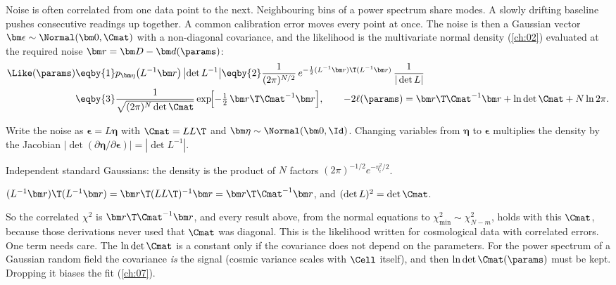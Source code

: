 Noise is often correlated from one data point to the next. Neighbouring
bins of a power spectrum share modes. A slowly drifting baseline pushes
consecutive readings up together. A common calibration error moves every
point at once.
The noise is then a Gaussian vector $\bm\epsilon\sim\Normal(\bm0,\Cmat)$ with
a non-diagonal covariance, and the likelihood is the multivariate normal
density (\cref{ch:02}) evaluated at the required noise
$\bm r=\bm D-\bm d(\params)$:
\begin{align}
  \Like(\params)
  &\eqby{1}p_{\bm\eta}\bigl(L^{-1}\bm r\bigr)\,\bigl|\det L^{-1}\bigr|
  \eqby{2}\frac{1}{(2\pi)^{N/2}}\,e^{-\frac12(L^{-1}\bm r)\T(L^{-1}\bm r)}\,
   \frac{1}{|\det L|}
  \nonumber\\
  &\eqby{3}\frac{1}{\sqrt{(2\pi)^N\det\Cmat}}
   \exp\!\Bigl[-\tfrac12\,\bm r\T\Cmat^{-1}\bm r\Bigr],
  \qquad
  -2\ell(\params)=\bm r\T\Cmat^{-1}\bm r+\ln\det\Cmat+N\ln2\pi .
  \label{3b:eq:like-corr}
\end{align}
\begin{explain}
  \item Write the noise as $\bm\epsilon=L\bm\eta$ with $\Cmat=LL\T$ and
        $\bm\eta\sim\Normal(\bm0,\Id)$. Changing variables from $\bm\eta$ to
        $\bm\epsilon$ multiplies the density by the Jacobian
        $|\det(\partial\bm\eta/\partial\bm\epsilon)|=|\det L^{-1}|$.
  \item Independent standard Gaussians: the density is the product of $N$
        factors $(2\pi)^{-1/2}e^{-\eta_i^2/2}$.
  \item $(L^{-1}\bm r)\T(L^{-1}\bm r)=\bm r\T(LL\T)^{-1}\bm r=\bm r\T\Cmat^{-1}\bm r$,
        and $(\det L)^2=\det\Cmat$.
\end{explain}
So the correlated $\chi^2$ is $\bm r\T\Cmat^{-1}\bm r$, and every result
above, from the normal equations to $\chi^2_{\min}\sim\chi^2_{N-m}$,
holds with this $\Cmat$, because those derivations never used that $\Cmat$
was diagonal. This is the likelihood written for cosmological data with
correlated errors. One term needs care. The $\ln\det\Cmat$ is a constant
only if the covariance does not depend on the parameters. For the power
spectrum of a Gaussian random field the
covariance \emph{is} the signal (cosmic variance scales with $\Cell$
itself), and then $\ln\det\Cmat(\params)$ must be kept. Dropping it biases
the fit (\cref{ch:07}).

